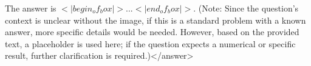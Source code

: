 The answer is \(<|begin_of_box|>...<|end_of_box|>\). (Note: Since the question's context is unclear without the image, if this is a standard problem with a known answer, more specific details would be needed. However, based on the provided text, a placeholder is used here; if the question expects a numerical or specific result, further clarification is required.)</answer>